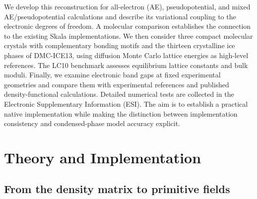 \documentclass[10pt,a4paper,twocolumn]{article}
\begin{document}
We develop this reconstruction for all-electron (AE), pseudopotential, and mixed AE/pseudopotential calculations and describe its variational coupling to the electronic degrees of freedom. A molecular comparison establishes the connection to the existing Skala implementations.\cite{Skala2025,Poeschel2026MolecularSkala} We then consider three compact molecular crystals with complementary bonding motifs and the thirteen crystalline ice phases of DMC-ICE13, using diffusion Monte Carlo lattice energies as high-level references.\cite{DellaPia2022Ice,DellaPia2024X23} The LC10 benchmark assesses equilibrium lattice constants and bulk moduli. Finally, we examine electronic band gaps at fixed experimental geometries and compare them with experimental references and published density-functional calculations. Detailed numerical tests are collected in the Electronic Supplementary Information (ESI). The aim is to establish a practical native implementation while making the distinction between implementation consistency and condensed-phase model accuracy explicit.

\section{Theory and Implementation}
\label{sec:theory}

\subsection{From the density matrix to primitive fields}
\end{document}
